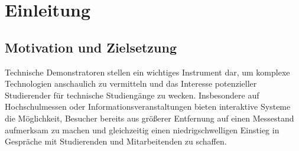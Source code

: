 \chapter{Einleitung}
\label{cha:Einleitung}



%
%



\section{Motivation und Zielsetzung}

Technische Demonstratoren stellen ein wichtiges Instrument dar, um komplexe Technologien anschaulich zu vermitteln und das Interesse potenzieller Studierender für technische Studiengänge zu wecken. Insbesondere auf Hochschulmessen oder Informationsveranstaltungen bieten interaktive Systeme die Möglichkeit, Besucher bereits aus größerer Entfernung auf einen Messestand aufmerksam zu machen und gleichzeitig einen niedrigschwelligen Einstieg in Gespräche mit Studierenden und Mitarbeitenden zu schaffen.

